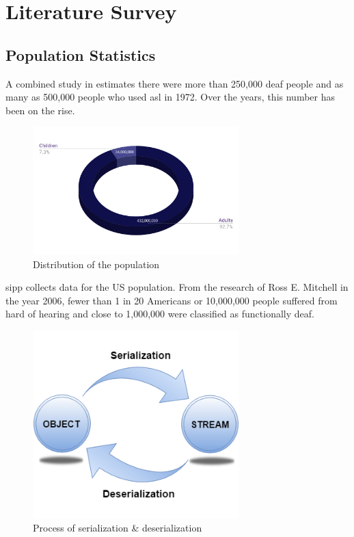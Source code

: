 \documentclass[twocolumn]{article}
\begin{document}
\section{Literature Survey}

\subsection{Population Statistics}
A combined study in \cite{mitchell2006many} estimates there were more than 
250,000 deaf people and as many as 500,000 people who used \gls{asl} in 1972. 
Over the years, this number has been on the rise.

\begin{figure}[h]
\centering
\includegraphics[width=8cm]{./figures/Distribution of the population}
\caption{Distribution of the population}
\end{figure}

\gls{sipp} collects data for the US population. From the research of 
Ross E. Mitchell \cite{mitchell2006many} in the year 2006, fewer than 1 in 20 
Americans or 10,000,000 people suffered from hard of hearing and close to 
1,000,000 were classified as functionally deaf.




\listoffigures

\glsaddall
\setlength{\glsdescwidth}{0.8\textwidth}
\printglossary[type=\acronymtype,title=List Of Abbreviations]

\begin{figure}[h]
\centering
\includegraphics[width=8cm]{./figures/serialization and deserialization}
\caption{Process of serialization \& deserialization}
\end{figure}
\end{document}
